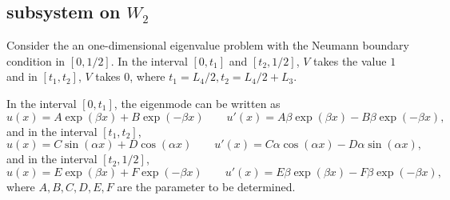 \documentclass[a4paper,11pt]{article}
\begin{document}
\begin{appendices}
\subsection{subsystem on $W_2$}

Consider the an one-dimensional eigenvalue problem with the Neumann boundary condition in $[0, 1/2]$. In the interval $[0, t_1]$ and $[t_2, 1/2]$, $V$ takes the value $1$ and in $[t_1, t_2]$, $V$ takes $0$, where $t_1 = L_4/2, t_2 = L_4/2 + L_3$.

In the interval $[0, t_1]$, the eigenmode can be written as
\begin{equation*}
u(x) = A \exp(\beta x) + B \exp(-\beta x) \qquad u'(x) = A \beta \exp(\beta x) - B \beta \exp(-\beta x),
\end{equation*}
and in the interval $[t_1, t_2]$,
\begin{equation*}
u(x) = C \sin(\alpha x) + D \cos(\alpha x) \qquad u'(x) = C \alpha \cos(\alpha x) - D \alpha \sin(\alpha x),
\end{equation*}
and in the interval $[t_2, 1/2]$,
\begin{equation*}
u(x) = E \exp(\beta x) + F \exp(-\beta x) \qquad u'(x) = E \beta \exp(\beta x) - F \beta \exp(-\beta x),
\end{equation*}
where $A ,B, C, D, E, F$ are the parameter to be determined.


\end{appendices}
\end{document}
